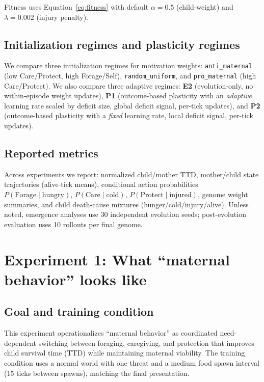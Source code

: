 Fitness uses Equation~\eqref{eq:fitness} with default $\alpha=0.5$ (child-weight) and $\lambda=0.002$ (injury penalty).

\subsection{Initialization regimes and plasticity regimes}
We compare three initialization regimes for motivation weights:
\texttt{anti\_maternal} (low Care/Protect, high Forage/Self),
\texttt{random\_uniform},
and \texttt{pro\_maternal} (high Care/Protect).
We also compare three adaptive regimes:
\textbf{E2} (evolution-only, no within-episode weight updates),
\textbf{P1} (outcome-based plasticity with an \emph{adaptive} learning rate scaled by deficit size, global deficit signal, per-tick updates), and
\textbf{P2} (outcome-based plasticity with a \emph{fixed} learning rate, local deficit signal, per-tick updates).

\subsection{Reported metrics}
Across experiments we report: normalized child/mother TTD, mother/child state trajectories (alive-tick means), conditional action probabilities $P(\text{Forage}\mid\text{hungry})$, $P(\text{Care}\mid\text{cold})$, $P(\text{Protect}\mid\text{injured})$, genome weight summaries, and child death-cause mixtures (hunger/cold/injury/alive).
Unless noted, emergence analyses use 30 independent evolution seeds; post-evolution evaluation uses 10 rollouts per final genome.

\section{Experiment 1: What ``maternal behavior'' looks like}
\subsection{Goal and training condition}
This experiment operationalizes ``maternal behavior'' as coordinated need-dependent switching between foraging, caregiving, and protection that improves child survival time (TTD) while maintaining maternal viability. The training condition uses a normal world with one threat and a medium food spawn interval (15 ticks between spawns), matching the final presentation.

